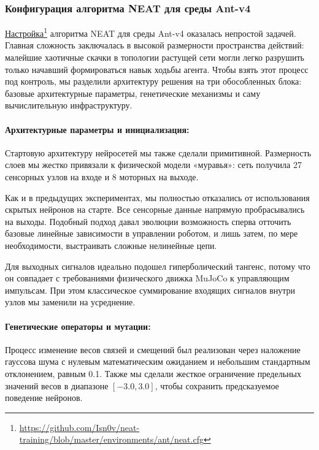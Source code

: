 \subsubsection{Конфигурация алгоритма NEAT для среды Ant-v4}


\href{https://github.com/Isn0v/neat-training/blob/master/environments/ant/neat.cfg}{Настройка}\footnote{\url{https://github.com/Isn0v/neat-training/blob/master/environments/ant/neat.cfg}} алгоритма NEAT для среды Ant-v4 оказалась непростой задачей. Главная сложность заключалась в высокой размерности пространства действий: малейшие хаотичные скачки в топологии растущей сети могли легко разрушить только начавший формироваться навык ходьбы агента. Чтобы взять этот процесс под контроль, мы разделили архитектуру решения на три обособленных блока: базовые архитектурные параметры, генетические механизмы и саму вычислительную инфраструктуру.

\paragraph{Архитектурные параметры и инициализация:}

Стартовую архитектуру нейросетей мы также сделали примитивной. Размерность слоев мы жестко привязали к физической модели «муравья»: сеть получила 27 сенсорных узлов на входе и 8 моторных на выходе.

Как и в предыдущих экспериментах, мы полностью отказались от использования скрытых нейронов на старте. Все сенсорные данные напрямую пробрасывались на выходы. Подобный подход давал эволюции возможность сперва отточить базовые линейные зависимости в управлении роботом, и лишь затем, по мере необходимости, выстраивать сложные нелинейные цепи.

Для выходных сигналов идеально подошел гиперболический тангенс, потому что он совпадает с требованиями физического движка MuJoCo к управляющим импульсам. При этом классическое суммирование входящих сигналов внутри узлов мы заменили на усреднение.

\paragraph{Генетические операторы и мутации:}

Процесс изменение весов связей и смещений был реализован через наложение гауссова шума с нулевым математическим ожиданием и небольшим стандартным отклонением, равным 0.1. Также мы сделали жесткое ограничение предельных значений весов в диапазоне $[-3.0, 3.0]$, чтобы сохранить предсказуемое поведение нейронов.

